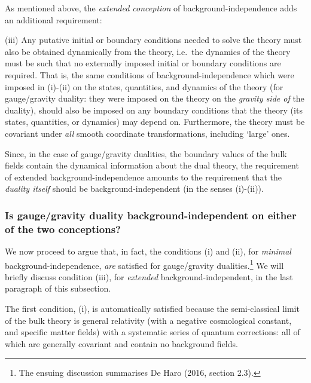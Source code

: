 \documentclass[12pt]{article}
\renewcommand{\^}[1]{\hat{#1}}
\begin{document}
As mentioned above, the {\it extended conception} of background-independence adds an additional requirement:

(iii) Any putative initial or boundary conditions needed to solve the theory must also be obtained dynamically from the theory, i.e.~the dynamics of the theory must be such that no externally imposed initial or boundary conditions are required. That is, the same conditions of background-independence which were imposed in (i)-(ii) on the states, quantities, and dynamics of the theory (for gauge/gravity duality: they were imposed on the theory on the {\it gravity side of} the duality), should also be imposed on any boundary conditions that the theory (its states, quantities, or dynamics) may depend on. Furthermore, the theory must be covariant under {\it all} smooth coordinate transformations, including `large' ones.

Since, in the case of gauge/gravity dualities, the boundary values of the bulk fields contain the dynamical information about the dual theory, the requirement of extended background-independence amounts to the requirement that the {\it duality itself} should be background-independent (in the senses (i)-(ii)). 

\subsubsection{Is gauge/gravity duality background-independent on either of the two conceptions?}

We now proceed to argue that, in fact, the conditions (i) and (ii), for {\it minimal} background-independence, {\em are} satisfied for gauge/gravity dualities.\footnote{The ensuing discussion summarises De Haro (2016, section 2.3).} We will briefly discuss condition (iii), for {\it extended} background-independent, in the last paragraph of this subsection.

The first condition, (i), is automatically satisfied because the semi-classical limit of the bulk theory is general relativity (with a negative cosmological constant, and specific matter fields) with a systematic series of quantum corrections: all of which are generally covariant and contain no background fields. 
\end{document}

